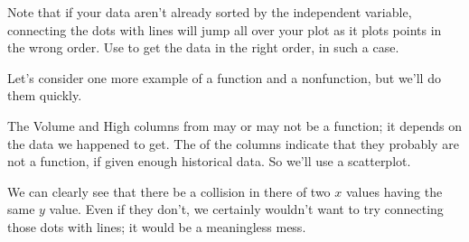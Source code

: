\documentclass[letterpaper,10pt,english]{jupyterBook}
\begin{document}
\sphinxAtStartPar
Note that if your data aren’t already sorted by the independent variable, connecting the dots with lines will jump all over your plot as it plots points in the wrong order.  Use  to get the data in the right order, in such a case.

\sphinxAtStartPar
Let’s consider one more example of a function and a non\sphinxhyphen{}function, but we’ll do them quickly.

\sphinxAtStartPar
{} The Volume and High columns from  may or may not be a function; it depends on the data we happened to get.  The  of the columns indicate that they probably are not a function, if given enough historical data.  So we’ll use a scatterplot.

\begin{sphinxVerbatim}[commandchars=\\\{\}]
 \PYG{p}{[}\PYG{p}{]} \PYG{p}{[}\PYG{p}{]}   
      
  
  
\end{sphinxVerbatim}

\noindent{}

\sphinxAtStartPar
We can clearly see that there  be a collision in there of two \(x\) values having the same \(y\) value.  Even if they don’t, we certainly wouldn’t want to try connecting those dots with lines; it would be a meaningless mess.
\end{document}
